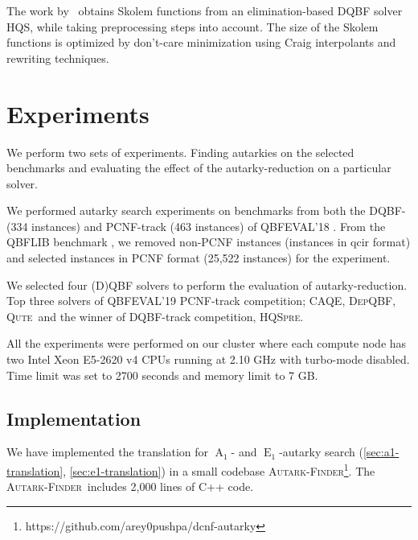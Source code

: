 \documentclass[runningheads]{llncs}
\DeclareMathOperator{\Aaut}{A}
\DeclareMathOperator{\Eaut}{E}
\newcommand{\caqe}{\textsc{CAQE}}
\newcommand{\depqbf}{\textsc{DepQBF}}
\newcommand{\qute}{\textsc{Qute}}
\newcommand{\hqspre}{\textsc{HQSpre}}
\newcommand{\autfinder}{\textsc{Autark-Finder}}
\begin{document}

The work by~\cite{wimmer2016skolem} obtains Skolem functions from an elimination-based DQBF solver HQS, while taking preprocessing steps into account.
%
The size of the Skolem functions is optimized by don’t-care minimization using Craig interpolants and rewriting techniques.


\section{Experiments}\label{sec:experiments}
We perform two sets of experiments. Finding autarkies on the selected benchmarks and evaluating the effect of the autarky-reduction on a particular solver.

We performed autarky search experiments on benchmarks from both the DQBF- (334 instances) and  PCNF-track (463 instances) of QBFEVAL'18 \cite{Qbfeval18}.
%
From the QBFLIB benchmark \cite{Qbflib}, we removed non-PCNF instances (instances in qcir format) and selected instances in PCNF format (25,522 instances) for the experiment.



We selected four (D)QBF solvers to perform the evaluation of autarky-reduction. Top three solvers of QBFEVAL'19 PCNF-track competition; \caqe \cite{DBLP:conf/fmcad/RabeT15}, \depqbf \cite{DBLP:conf/cade/LonsingE17}, \qute \cite{DBLP:journals/jsat/PeitlSS19}\ and the winner of DQBF-track competition, \hqspre \cite{DBLP:conf/tacas/WimmerRM017}.

All the experiments were performed on our cluster where each compute node has
two Intel Xeon E5-2620 v4 CPUs running at 2.10 GHz with turbo-mode disabled.
Time limit was set to 2700 seconds and memory limit to 7 GB.

\subsection{Implementation}
We have implemented the translation for $\Aaut_1$- and $\Eaut_1$-autarky search  (\ref{sec:a1-translation}, \ref{sec:e1-translation}) in a small codebase \autfinder\footnote{https://github.com/arey0pushpa/dcnf-autarky}. The \autfinder\ includes 2,000 lines of C++ code.
\end{document}
